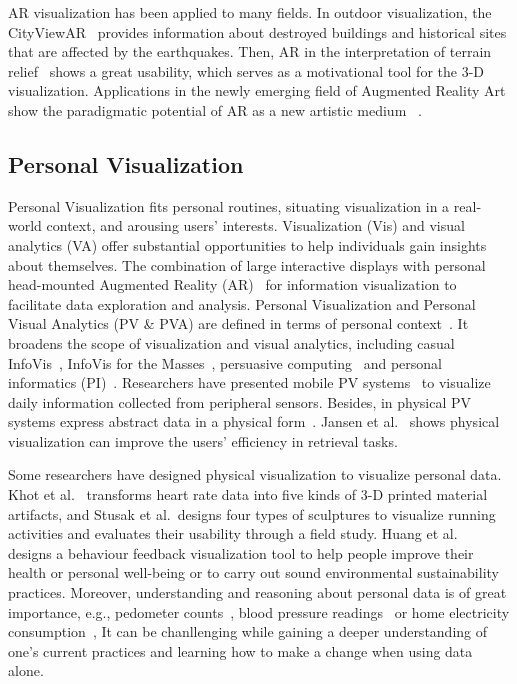 AR visualization has been applied to many fields.
In outdoor visualization,
the CityViewAR~\cite{Lee2012} provides information about destroyed buildings and historical sites that are affected by the earthquakes.
Then,
AR in the interpretation of terrain relief~\cite{Carrera2018} shows a great usability,
which serves as a motivational tool for the 3-D visualization.
Applications in the newly emerging field of Augmented Reality Art
show the paradigmatic potential of AR as a new artistic medium~\cite{Geroimenko2012} .

\subsection{Personal Visualization}
Personal Visualization fits personal routines, situating visualization in a real-world context, and arousing users' interests.
Visualization (Vis) and visual analytics (VA) offer substantial opportunities to help individuals gain insights about themselves.
The combination of large interactive displays with personal head-mounted Augmented Reality (AR)~\cite{Reipschlager2021} for information visualization to facilitate data exploration and analysis.
Personal Visualization and Personal Visual Analytics (PV \& PVA) are defined in terms of personal context~\cite{Huang2014}.
It broadens the scope of visualization and visual analytics,
including casual InfoVis~\cite{Pousman2007}, InfoVis for the Masses~\cite{Danziger2008},
persuasive computing~\cite{Fogg1998} and personal informatics (PI)~\cite{Li2010, Li2010a}.
Researchers have presented mobile PV systems~\cite{Chiu2009, Kim2010, Kjeldskov2012}
to visualize daily information collected from peripheral sensors.
Besides, in physical PV systems express abstract data in a physical form~\cite{Jansen2015}.
Jansen et al.~\cite{Jansen2013, Jansen2015a} shows physical visualization can improve the users' efficiency in retrieval tasks.

Some researchers have designed physical visualization to visualize personal data.
Khot et al.~\cite{Khot2014} transforms heart rate data into five kinds of 3-D printed material artifacts,
and Stusak et al.~\cite{Stusak2014}designs four types of sculptures to visualize running activities and
evaluates their usability through a field study.
Huang et al.~\cite{Huang2016} designs a behaviour feedback visualization tool
to help people improve their health or personal well-being or to carry out sound environmental sustainability practices.
Moreover, understanding and reasoning about personal data is of great importance,
e.g., pedometer counts~\cite{Stusak2014}, blood pressure readings~\cite{Goh2016} or home electricity consumption~\cite{Monigatti2010},
It can be chanllenging while gaining a deeper understanding of one's current practices and learning how to make a change when using data alone.

